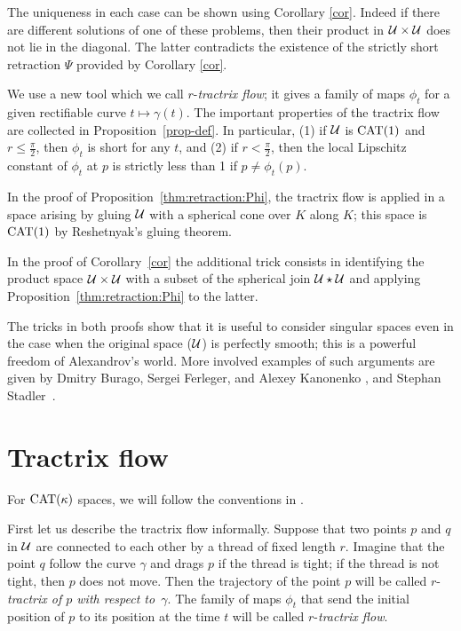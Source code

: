\documentclass[oneside,a4paper, 12pt]{article}
\begin{document}
The uniqueness in each case can be shown using Corollary \ref{cor}.
Indeed if there are different solutions of one of these problems, then their product in ${\mathcal{U}}\times {\mathcal{U}}$ does not lie in the diagonal.
The latter contradicts the existence of the strictly short retraction $\Psi$ provided by Corollary \ref{cor}.

We use a new tool which we call $r$-\emph{tractrix flow}; it gives a family of maps $\phi_t$ for a given rectifiable curve $t\mapsto\gamma(t)$.
The important properties of the tractrix flow are collected in Proposition~\ref{prop-def}.
In particular, (1) if $\mathcal{U}$ is $\mathrm{CAT}(1)$ and $r\le \tfrac\pi2$, then $\phi_t$ is short for any $t$, 
and (2) if $r< \tfrac\pi2$, then the local Lipschitz constant of $\phi_t$ at $p$ is strictly less than 1 if $p\ne \phi_t(p)$.

In the proof of Proposition~\ref{thm:retraction:Phi}, the tractrix flow is applied in a space arising by gluing $\mathcal{U}$ with a spherical cone over $K$ along $K$;
this space is $\mathrm{CAT}(1)$ by Reshetnyak's gluing theorem.

In the proof of Corollary~\ref{cor} the additional trick consists in identifying the product space $\spc{U}\z\times \spc{U}$ with a subset of the spherical join $\mathcal{U}\star \mathcal{U}$ and applying  Proposition~\ref{thm:retraction:Phi} to the latter.

The tricks in both proofs show that it is useful to consider singular spaces even in the case when the original space ($\mathcal{U}$) is perfectly smooth;
this is a powerful freedom of Alexandrov's world.
More involved examples of such arguments are given by Dmitry Burago, Sergei Ferleger, and Alexey Kanonenko \cite{BFK}, and Stephan Stadler~\cite{stadler}.

\section{Tractrix flow}\label{sec:Tractrix flow}

For $\mathrm{CAT}(\kappa)$ spaces, we will follow the conventions in \cite{akp}.

First let us describe the tractrix flow informally.
Suppose that two points $p$ and $q$ in ${\mathcal{U}}$ are connected to each other by a thread of fixed length $r$.
Imagine that the point $q$ follow the curve $\gamma$ and drags $p$ if the thread is tight; 
if the thread is not tight, then $p$ does not move.
Then the trajectory of the point $p$ will be called $r$-\emph{tractrix of $p$ with respect to~$\gamma$}.
The family of maps $\phi_t$ that send the initial position of $p$ to its position at the time $t$ will be called $r$-\emph{tractrix flow}.
\end{document}
